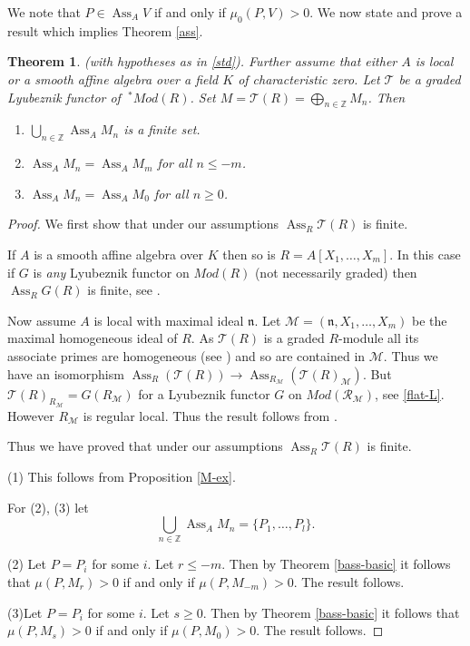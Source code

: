 \documentclass{amsart}
\newcommand{\ZZ}{\mathbb{Z} }
\newcommand{\n}{\mathfrak{n} }
\newcommand{\M}{\mathcal{M} }
\newcommand{\R}{\mathcal{R} }
\newcommand{\rt}{\rightarrow}
\newcommand{\FF}{\mathcal{T}}
\newcommand{\Ass}{\operatorname{Ass}}
\theoremstyle{plain}
\newtheorem{theorem}{Theorem}[section]
\theoremstyle{definition}
\theoremstyle{remark}
\begin{document}
\s We note that $P \in \Ass_A V$ if and only if $\mu_0(P, V) > 0$.
 We now state and prove a result which implies Theorem \ref{ass}.
 \begin{theorem}\label{ass-gen}
 (with hypotheses as in \ref{std}). 
  Further assume that either $A$ is local or a smooth affine algebra over a field $K$ of characteristic zero. Let  $\FF$ be a graded Lyubeznik functor of $ \ ^* Mod(R)$. Set $M = \FF(R) = \bigoplus_{n \in \ZZ}M_n$. Then
\begin{enumerate}[\rm (1)]
\item
$\bigcup_{n \in \ZZ} \Ass_A M_n   $ is a finite set.
\item
$\Ass_A M_n = \Ass_A M_m$ for all $n \leq -m$.
\item
$\Ass_A M_n = \Ass_A M_0$ for all $n \geq 0$.
\end{enumerate}
\end{theorem}
 \begin{proof}
 We first show that under our assumptions $\Ass_R \FF(R)$ is finite.
 
 If $A$ is a smooth affine algebra over $K$ then so is $R = A[X_1,\ldots, X_m]$. In this case if $G$ is \emph{any} Lyubeznik functor on $Mod(R)$ (not necessarily graded) then $\Ass_R G(R)$ is finite, see \cite[3.7]{Lyu-1}.
 
 Now assume $A$ is local with maximal ideal $\n$. Let $\M = (\n, X_1,\ldots, X_m)$ be the maximal homogeneous ideal of $R$. As $\FF(R)$ is a graded $R$-module all its associate primes are homogeneous (see \cite[1.5.6]{BH}) and  so are contained in $\M$. Thus we have an isomorphism $\Ass_R(\FF(R)) \rt \Ass_{R_\M}(\FF(R)_\M)$. But
 $\FF(R)_{R_\M} = G(R_\M)$ for a Lyubeznik functor $G$ on $Mod(\R_\M)$, see \ref{flat-L}. However $R_\M$ is regular local. Thus the result follows from \cite[3.3]{Lyu-1}.
 
 Thus we have proved that under our assumptions $\Ass_R \FF(R)$ is finite.
 
 (1) This follows from Proposition \ref{M-ex}.
 
 For (2), (3) let 
 \[
 \bigcup_{n \in \ZZ} \Ass_A M_n  = \{ P_1, \ldots, P_l \}.
 \]
 
 (2) Let $P = P_i$ for some $i$. 
 Let $r \leq -m$. Then by Theorem  \ref{bass-basic} it follows that $\mu(P, M_r) > 0$ if and only if $\mu(P, M_{-m}) > 0$.   The result follows.
 
 (3)Let $P = P_i$ for some $i$. 
 Let $s \geq 0$. Then by Theorem  \ref{bass-basic} it follows that $\mu(P, M_s) > 0$ if and only if $\mu(P, M_{0}) > 0$.   The result follows.
 \end{proof}
 
\end{document}
